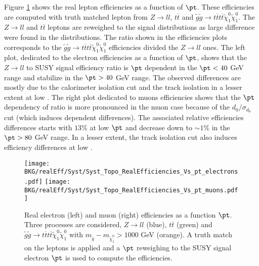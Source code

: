 	Figure \ref{fig:Syst_Eff_Vs_pt} shows the real lepton efficiencies as a function of $\pt$. These efficiencies are computed with truth matched lepton from $Z \rightarrow ll$, $t\overline{t}$ and $\tilde{g}\tilde{g} \rightarrow t\overline{t}t\overline{t} \tilde{\chi}^0_1 \tilde{\chi}^0_1$. The $Z \rightarrow ll$ and $t\overline{t}$ leptons are reweighed to the signal \pt distributions as large difference were found in the \pt distributions. The ratio shown in the efficiencies plots corresponds to the $\tilde{g}\tilde{g} \rightarrow t\overline{t}t\overline{t} \tilde{\chi}^0_1 \tilde{\chi}^0_1$ efficiencies divided the $Z \rightarrow ll$ ones. 
	The left plot, dedicated to the electron efficiencies as a function of $\pt$, shows that the $Z\rightarrow ll$ to SUSY signal efficiency ratio is $\pt$ dependent in the $\pt < 40$ GeV range and stabilize in the $\pt > 40$ GeV range. The observed differences are mostly due to the calorimeter isolation cut and the track isolation in a lesser extent at low \pt. The right plot dedicated to muons efficiencies shows that the $\pt$ dependency of ratio is more pronounced in the muon case because of the $d_{0}/\sigma_{d_{0}}$ cut (which induces \pt dependent differences). The associated relative efficiencies differences starts with $13\%$ at low $\pt$ and decrease down to $\sim 1\%$ in the $\pt > 80$ GeV range. In a lesser extent, the track isolation cut also induces efficiency differences at low \pt. \\ 
	

\begin{figure}[!h]
	\begin{center} 
	   \texttt{[image: BKG/realEff/Syst/Syst\_Topo\_RealEfficiencies\_Vs\_pt\_electrons.pdf]} 
	   \texttt{[image: BKG/realEff/Syst/Syst\_Topo\_RealEfficiencies\_Vs\_pt\_muons.pdf]}
	   \caption{\label{fig:Syst_Eff_Vs_pt} Real electron (left) and muon (right) efficiencies as a function $\pt$. Three processes are considered, $Z\rightarrow ll$ (blue), $t\overline{t}$ (green) and  $\tilde{g}\tilde{g} \rightarrow t\overline{t}t\overline{t} \tilde{\chi}^0_1 \tilde{\chi}^0_1$ with $m_{\tilde{g}} - m_{\tilde{\chi}^0_1} > 1000$ GeV (orange). A truth match on the leptons is applied and a $\pt$ reweighing to the SUSY signal electron $\pt$ is used to compute the efficiencies.}
	\end{center}
\end{figure}	


